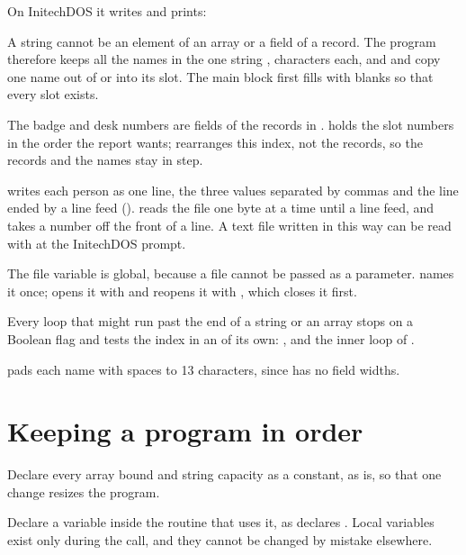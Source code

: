 
On InitechDOS it writes  and prints:


A string cannot be an element of an array or a
field of a record.  The program therefore keeps all the names in the one
string ,  characters each, and  and
 copy one name out of or into its slot.  The main block first
fills  with blanks so that every slot exists.

The badge and desk numbers are fields of the
records in .   holds the slot numbers in the order the
report wants;  rearranges this index, not the records, so
the records and the names stay in step.

 writes each person as one line, the three
values separated by commas and the line ended by a line feed ().
 reads the file one byte at a time until a line feed, and
 takes a number off the front of a line.  A text file written in
this way can be read with  at the InitechDOS prompt.

The file variable  is global, because
a file cannot be passed as a parameter.   names it once;
 opens it with  and  reopens it with
, which closes it first.

Every loop that might run past the end of a string or an
array stops on a Boolean flag and tests the index in an  of its own:
,  and the inner loop of .

 pads each name with spaces to 13 characters,
since  has no field widths.

\section{Keeping a program in order}
Declare every array bound and string capacity
as a constant, as  is, so that one change resizes the
program.

Declare a variable inside the routine that uses
it, as  declares .  Local variables exist only during
the call, and they cannot be changed by mistake elsewhere.

